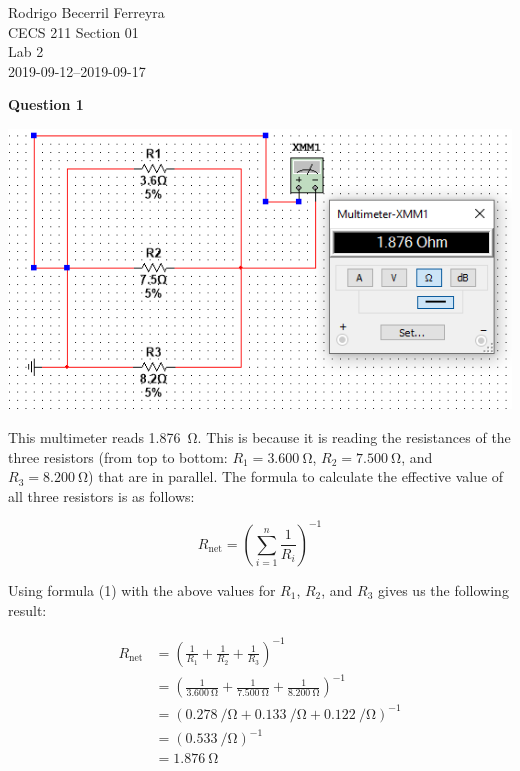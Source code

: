 \documentclass{article}
\begin{document}
    
\begin{flushright}
    \noindent
    Rodrigo Becerril Ferreyra\\
    CECS 211 Section 01\\
    Lab 2\\
    2019-09-12--2019-09-17
\end{flushright}

\textbf{Question 1}

\includegraphics[width=\textwidth]{Lab3Screenshot1.png}

This multimeter reads \SI{1.876}{\ohm}. This is because it is reading the
resistances of the three resistors (from top to bottom:
$R_1 = \SI{3.600}{\ohm}$,
$R_2 = \SI{7.500}{\ohm}$, and
$R_3 = \SI{8.200}{\ohm}$)
that are in parallel. The formula to calculate the effective value of
all three resistors is as follows:

\begin{equation}
    R_{\text{net}} = \left( \sum_{i=1}^n \frac1{R_i} \right)^{-1}
\end{equation}

Using formula (1) with the above values for $R_1$, $R_2$, and $R_3$ gives
us the following result:

\begin{align*}
    R_{\text{net}}
    &= \left( \frac1{R_1} + \frac1{R_2} + \frac1{R_3} \right)^{-1}\\ 
    &= \left( \frac{1}{\SI{3.600}{\ohm}} + \frac1{\SI{7.500}{\ohm}} + \frac1{\SI{8.200}{\ohm}} \right)^{-1}\\ 
    &= \left( \SI{0.278}{\per\ohm} + \SI{0.133}{\per\ohm} + \SI{0.122}{\per\ohm} \right)^{-1}\\
    &= \left(\SI{0.533}{\per\ohm}\right)^{-1}\\
    &= \SI{1.876}{\ohm}
\end{align*}
\end{document}
